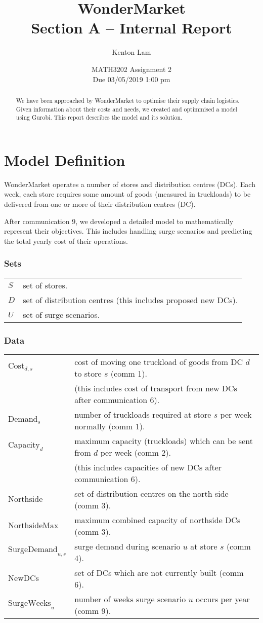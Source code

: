 \documentclass[11pt,a4paper]{article}
\author{Kenton Lam}
\date{{MATH3202 Assignment 2 \\ Due 03/05/2019 1:00 pm}}
\title{WonderMarket \\ Section A -- Internal Report}
\begin{document}
\maketitle
\begin{abstract}
    We have been approached by WonderMarket to optimise their supply chain logistics.
    Given information about their costs and needs, we created and optimmised a model using Gurobi.
    This report describes the model and its solution.
\end{abstract}

\part{Model Definition}
WonderMarket operates a number of stores and distribution centres (DCs).
Each week, each store requires some amount of goods (measured in truckloads)
to be delivered from one or more of their distribution centres (DC).

After communication 9, we developed a detailed model to mathematically represent
their objectives. This includes handling surge scenarios and predicting the 
total yearly cost of their operations.

\section{Sets}
\begin{tabular}{l l}
    $S$ & set of stores. \\ 
    $D$ & set of distribution centres (this includes proposed new DCs). \\ 
    $U$ & set of surge scenarios.   
\end{tabular}

\section{Data}
\begin{tabular}{l l}
    $\mathrm{Cost}_{d,s}$ & cost of moving one truckload of goods from DC $d$ to store $s$ (comm 1). \\
    &(this includes cost of transport from new DCs after communication 6).\\ 
    $\mathrm{Demand}_s$ & number of truckloads required at store $s$ per week normally (comm 1). \\
    $\mathrm{Capacity}_d$ & maximum capacity (truckloads) which can be sent from $d$ per week (comm 2).  \\
    & (this includes capacities of new DCs after communication 6).\\ 
    $\mathrm{Northside}$ & set of distribution centres on the north side (comm 3). \\ 
    $\mathrm{NorthsideMax}$ & maximum combined capacity of northside DCs (comm 3). \\ 
    $\mathrm{SurgeDemand}_{u,s}$ & surge demand during scenario $u$ at store $s$ (comm 4). \\ 
    $\mathrm{NewDCs}$ & set of DCs which are not currently built (comm 6).\\ 
    $\mathrm{SurgeWeeks}_u$ & number of weeks surge scenario $u$ occurs per year (comm 9). 
\end{tabular}
\end{document}

